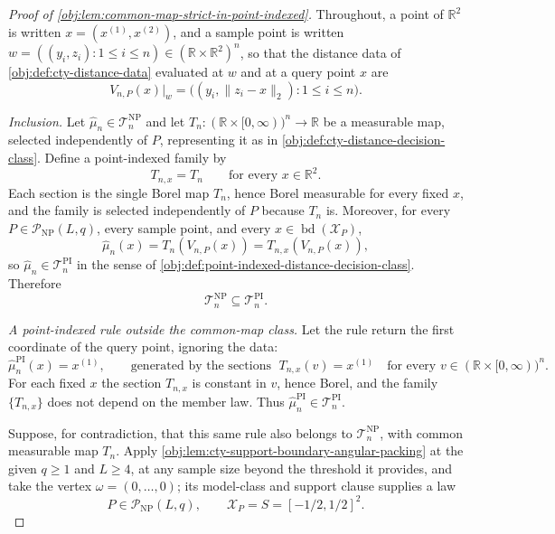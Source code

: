 \documentclass[11pt]{article}
\begin{document}
\begin{proof}[Proof of \cref{obj:lem:common-map-strict-in-point-indexed}]
Throughout, a point of \(\mathbb R^2\) is written \(x=(x^{(1)},x^{(2)})\), and a sample point is written \(w=((y_i,z_i):1\leq i\leq n)\in(\mathbb R\times\mathbb R^2)^n\), so that the distance data of \cref{obj:def:cty-distance-data} evaluated at \(w\) and at a query point \(x\) are
\[
V_{n,P}(x)\big|_{w}
=
\bigl((y_i,\lVert z_i-x\rVert_2):1\leq i\leq n\bigr).
\]

\emph{Inclusion.}  Let \(\widehat\mu_n\in\mathcal T_n^{\mathrm{NP}}\) and let \(T_n:(\mathbb R\times[0,\infty))^n\to\mathbb R\) be a measurable map, selected independently of \(P\), representing it as in \cref{obj:def:cty-distance-decision-class}.  Define a point-indexed family by
\[
T_{n,x}=T_n
\qquad\text{for every }x\in\mathbb R^2 .
\]
Each section is the single Borel map \(T_n\), hence Borel measurable for every fixed \(x\), and the family is selected independently of \(P\) because \(T_n\) is.  Moreover, for every \(P\in\mathcal P_{\mathrm{NP}}(L,q)\), every sample point, and every \(x\in\operatorname{bd}(\mathcal X_P)\),
\[
\widehat\mu_n(x)=T_n(V_{n,P}(x))=T_{n,x}(V_{n,P}(x)),
\]
so \(\widehat\mu_n\in\mathcal T_n^{\mathrm{PI}}\) in the sense of \cref{obj:def:point-indexed-distance-decision-class}.  Therefore
\[
\mathcal T_n^{\mathrm{NP}}\subseteq \mathcal T_n^{\mathrm{PI}}.
\]

\emph{A point-indexed rule outside the common-map class.}  Let the rule return the first coordinate of the query point, ignoring the data:
\[
\widehat\mu_{n}^{\mathrm{PI}}(x)=x^{(1)},
\qquad\text{generated by the sections }\;
T_{n,x}(v)=x^{(1)}
\quad\text{for every }v\in(\mathbb R\times[0,\infty))^n .
\]
For each fixed \(x\) the section \(T_{n,x}\) is constant in \(v\), hence Borel, and the family \(\{T_{n,x}\}\) does not depend on the member law.  Thus \(\widehat\mu_n^{\mathrm{PI}}\in\mathcal T_n^{\mathrm{PI}}\).

Suppose, for contradiction, that this same rule also belongs to \(\mathcal T_n^{\mathrm{NP}}\), with common measurable map \(T_n\).  Apply \cref{obj:lem:cty-support-boundary-angular-packing} at the given \(q\geq1\) and \(L\geq4\), at any sample size beyond the threshold it provides, and take the vertex \(\omega=(0,\ldots,0)\); its model-class and support clause supplies a law
\[
P\in\mathcal P_{\mathrm{NP}}(L,q),
\qquad
\mathcal X_P=S=[-1/2,1/2]^2 .
\]


\end{proof}
\end{document}
